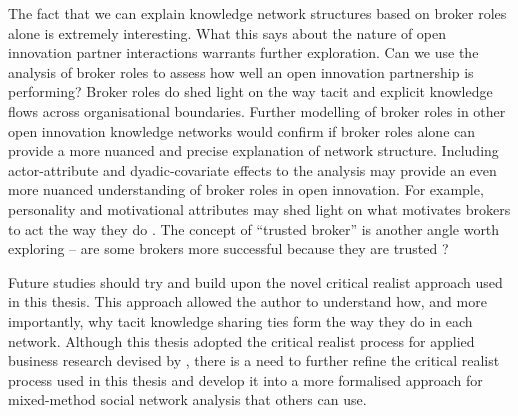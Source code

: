 The fact that we can explain knowledge network structures based on broker roles alone is extremely interesting. What this says about the nature of open innovation partner interactions warrants further exploration. Can we use the analysis of broker roles to assess how well an open innovation partnership is performing? Broker roles do shed light on the way tacit and explicit knowledge flows across organisational boundaries. Further modelling of broker roles in other open innovation knowledge networks would confirm if broker roles alone can provide a more nuanced and precise explanation of network structure. Including actor-attribute and dyadic-covariate effects to the analysis may provide an even more nuanced understanding of broker roles in open innovation. For example, personality and motivational attributes may shed light on what motivates brokers to act the way they do \citep{davis2010agency,obstfeld2014brokerage, quintane2016brokers, grosser2019measuring}. The concept of \enquote{trusted broker} is another angle worth exploring -- are some brokers more successful because they are trusted \citep{long2013bridges,kwon2020network}? 

Future studies should try and build upon the novel critical realist approach used in this thesis. This approach allowed the author to understand how, and more importantly, why tacit knowledge sharing ties form the way they do in each network. Although this thesis adopted the critical realist process for applied business research devised by \citet{mcavoy2018critical}, there is a need to further refine the critical realist process used in this thesis and develop it into a more formalised approach for mixed-method social network analysis that others can use. 

